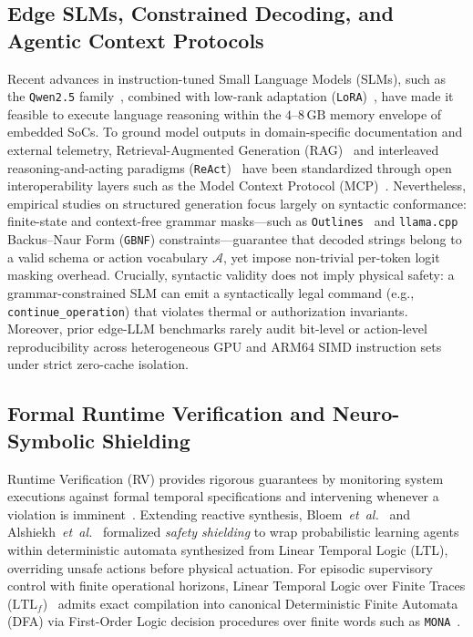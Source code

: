\documentclass{ieeeaccess}
\begin{document}
\subsection{Edge SLMs, Constrained Decoding, and Agentic Context Protocols}
Recent advances in instruction-tuned Small Language Models (SLMs), such as the \texttt{Qwen2.5} family~\cite{qwen25}, combined with low-rank adaptation (\texttt{LoRA})~\cite{hu2022lora,dettmers2023qlora}, have made it feasible to execute language reasoning within the $4$--$8\,\text{GB}$ memory envelope of embedded SoCs. To ground model outputs in domain-specific documentation and external telemetry, Retrieval-Augmented Generation (RAG)~\cite{lewis2020rag} and interleaved reasoning-and-acting paradigms (\texttt{ReAct})~\cite{yao2023react} have been standardized through open interoperability layers such as the Model Context Protocol (MCP)~\cite{mcp2024}. Nevertheless, empirical studies on structured generation focus largely on syntactic conformance: finite-state and context-free grammar masks—such as \texttt{Outlines}~\cite{willard2023outlines} and \texttt{llama.cpp} Backus--Naur Form (\texttt{GBNF}) constraints—guarantee that decoded strings belong to a valid schema or action vocabulary $\mathcal{A}$, yet impose non-trivial per-token logit masking overhead. Crucially, syntactic validity does not imply physical safety: a grammar-constrained SLM can emit a syntactically legal command (e.g., \texttt{continue\_operation}) that violates thermal or authorization invariants. Moreover, prior edge-LLM benchmarks rarely audit bit-level or action-level reproducibility across heterogeneous GPU and ARM64 SIMD instruction sets under strict zero-cache isolation.

\subsection{Formal Runtime Verification and Neuro-Symbolic Shielding}
Runtime Verification (RV) provides rigorous guarantees by monitoring system executions against formal temporal specifications and intervening whenever a violation is imminent~\cite{leucker2009rv}. Extending reactive synthesis, Bloem~\emph{et~al.}~\cite{bloem2015shield} and Alshiekh~\emph{et~al.}~\cite{alshiekh2018shield} formalized \emph{safety shielding} to wrap probabilistic learning agents within deterministic automata synthesized from Linear Temporal Logic (LTL), overriding unsafe actions before physical actuation. For episodic supervisory control with finite operational horizons, Linear Temporal Logic over Finite Traces ($\mathrm{LTL}_f$)~\cite{degiacomo2013ltlf} admits exact compilation into canonical Deterministic Finite Automata (DFA) via First-Order Logic decision procedures over finite words such as \texttt{MONA}~\cite{klarlund2001mona}.
\end{document}
